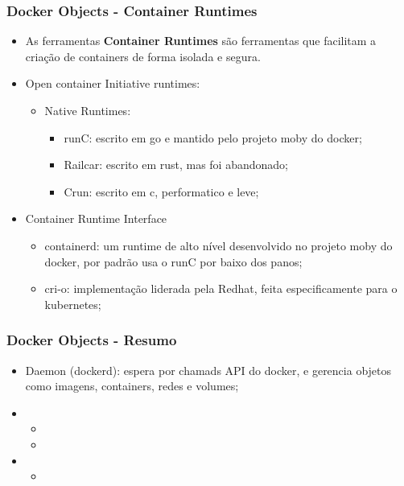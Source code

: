 \begin{frame}[t]
\frametitle{Docker Objects - Container Runtimes}
\begin{itemize}
	\item As ferramentas \textbf{Container Runtimes} são ferramentas que facilitam a criação de containers de forma isolada e segura.
	\item Open container Initiative runtimes:
		\begin{itemize}
			\item Native Runtimes:
			\begin{itemize}
				\item runC: escrito em go e mantido pelo projeto moby do docker;
				\item Railcar: escrito em rust, mas foi abandonado;
				\item Crun: escrito em c, performatico e leve;
			\end{itemize}
		\end{itemize}
	\item Container Runtime Interface
		\begin{itemize}
			\item containerd: um runtime de alto nível desenvolvido no projeto moby do docker, por padrão usa o runC por baixo dos panos;
			\item cri-o: implementação liderada pela Redhat, feita especificamente para o kubernetes;
		\end{itemize}
\end{itemize}
\end{frame}

\begin{frame}
\frametitle{Docker Objects - Resumo}
\begin{itemize}
	\item Daemon (dockerd): espera por chamads API do docker, e gerencia objetos como imagens, containers, redes e volumes;
	\item {}
		\begin{itemize}
			\item {}
			\item {}
		\end{itemize}
	\item {}
		\begin{itemize}
			\item {}
		\end{itemize}
\end{itemize}
\end{frame}

